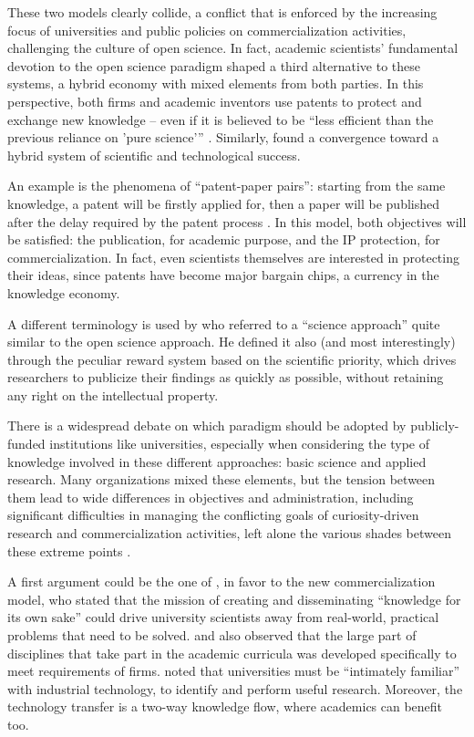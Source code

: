 These two models clearly collide, a conflict that is enforced by the increasing focus of universities and public policies on commercialization activities, challenging the culture of open science. In fact, academic scientists' fundamental devotion to the open science paradigm shaped a third alternative to these systems, a hybrid economy with mixed elements from both parties. In this perspective, both firms and academic inventors use patents to protect and exchange new knowledge – even if it is believed to be \enquote{less efficient than the previous reliance on 'pure science'} \citep{Geuna2009}. Similarly, \citet{OwenSmith2001} found a convergence toward a hybrid system of scientific and technological success.

An example is the phenomena of \enquote{patent-paper pairs}: starting from the same knowledge, a patent will be firstly applied for, then a paper will be published after the delay required by the patent process \citep{Murray2005}. In this model, both objectives will be satisfied: the publication, for academic purpose, and the IP protection, for commercialization. In fact, even scientists themselves are interested in protecting their ideas, since patents have become major bargain chips, a currency in the knowledge economy.

A different terminology is used by \citet{Stern2004} who referred to a \enquote{science approach} quite similar to the open science approach. He defined it also (and most interestingly) through the peculiar reward system based on the scientific priority, which drives researchers to publicize their findings as quickly as possible, without retaining any right on the intellectual property. 

There is a widespread debate on which paradigm should be adopted by publicly-funded institutions like universities, especially when considering the type of knowledge involved in these different approaches: basic science and applied research. Many organizations mixed these elements, but the tension between them lead to wide differences in objectives and administration, including significant difficulties in managing the conflicting goals of curiosity-driven research and commercialization activities, left alone the various shades between these extreme points \citep{Rasmussen2006}.

A first argument could be the one of \citet{Geuna2009}, in favor to the new commercialization model, who stated that the mission of creating and disseminating \enquote{knowledge for its own sake} could drive university scientists away from real-world, practical problems that need to be solved. \citet{Rosenberg1994} and \citet{Nelson1998} also observed that the large part of disciplines that take part in the academic curricula was developed specifically to meet requirements of firms. \citet{Balconi2006} noted that universities must be \enquote{intimately familiar} with industrial technology, to identify and perform useful research. Moreover, the technology transfer is a two-way knowledge flow, where academics can benefit too.

